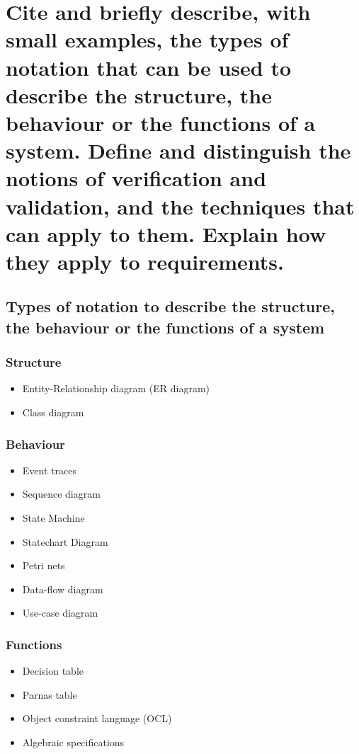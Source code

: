 \clearpage{}
\section{Cite and briefly describe, with small examples, the types of
notation that can be used to describe the structure, the behaviour or the
functions of a system. Define and distinguish the notions of verification
and validation, and the techniques that can apply to them. Explain how
they apply to requirements.}

\subsection{Types of notation to describe the structure, the behaviour or the functions
of a system}

\subsubsection{Structure}

\begin{itemize}
    \item Entity-Relationship diagram (ER diagram)
    \item Class diagram
\end{itemize}

\subsubsection{Behaviour}

\begin{itemize}
    \item Event traces
    \item Sequence diagram
    \item State Machine
    \item Statechart Diagram
    \item Petri nets
    \item Data-flow diagram
    \item Use-case diagram
\end{itemize}

\subsubsection{Functions}

\begin{itemize}
    \item Decision table
    \item Parnas table
    \item Object constraint language (OCL)
    \item Algebraic specifications
\end{itemize}

